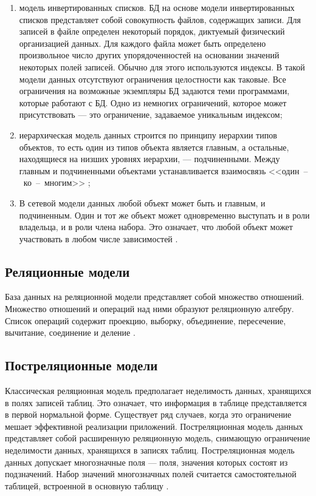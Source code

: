 \begin{enumerate}
	\item модель инвертированных списков.
	БД на основе модели инвертированных списков представляет собой совокупность файлов, содержащих записи.
	Для записей в файле определен некоторый порядок, диктуемый физический организацией данных.
	Для каждого файла может быть определено произвольное число других упорядоченностей на основании значений некоторых полей записей.
	Обычно для этого используются индексы.
	В такой модели данных отсутствуют ограничения целостности как таковые.
	Все ограничения на возможные экземпляры БД задаются теми программами, которые работают с БД.
	Одно из немногих ограничений, которое может присутствовать --- это ограничение, задаваемое уникальным индексом;
	
	\item иерархическая модель данных строится по принципу иерархии типов объектов, то есть один из типов объекта является главным, а остальные, находящиеся на низших уровнях иерархии, --- подчиненными.
	Между главным и подчиненными объектами устанавливается взаимосвязь <<один~--~ко~--~многим>> \cite{dbms};
	
	\item В сетевой модели данных любой объект может быть и главным, и подчиненным.
	Один и тот же объект может одновременно выступать и в роли владельца, и в роли члена набора.
	Это означает, что любой объект может участвовать в любом числе зависимостей \cite{dbms}.
\end{enumerate}

\subsection{Реляционные модели}
База данных на реляционной модели представляет собой множество отношений.
Множество отношений и операций над ними образуют реляционную алгебру.
Список операций содержит проекцию, выборку, объединение, пересечение, вычитание, соединение и деление \cite{dbms}.

\subsection{Постреляционные модели}
Классическая реляционная модель предполагает неделимость данных, хранящихся в полях записей таблиц.
Это означает, что информация в таблице представляется в первой нормальной форме.
Существует ряд случаев, когда это ограничение мешает эффективной реализации приложений.
Постреляционная модель данных представляет собой расширенную реляционную модель, снимающую ограничение неделимости данных, хранящихся в записях таблиц.
Постреляционная модель данных допускает многозначные поля --- поля, значения которых состоят из подзначений.
Набор значений многозначных полей считается самостоятельной таблицей, встроенной в основную таблицу \cite{voroneg}.
 
